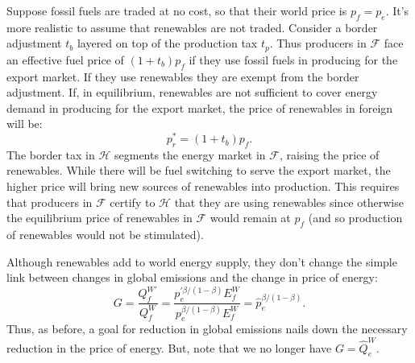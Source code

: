 \documentclass[notitlepage,12pt]{article}
\begin{document}
Suppose fossil fuels are traded at no cost, so that their world price is $%
p_{f}=p_{e}$. It's more realistic to assume that renewables are not traded.
Consider a border adjustment $t_{b}$ layered on top of the production tax $%
t_{p}$. Thus producers in $\mathcal{F}$ face an effective fuel price of $%
(1+t_{b})p_{f}$ if they use fossil fuels in producing for the export market.
If they use renewables they are exempt from the border adjustment. If, in
equilibrium, renewables are not sufficient to cover energy demand in
producing for the export market, the price of renewables in foreign will be:%
\begin{equation*}
p_{r}^{\ast }=(1+t_{b})p_{f}.
\end{equation*}%
The border tax in $\mathcal{H}$ segments the energy market in $\mathcal{F}$,
raising the price of renewables. While there will be fuel switching to serve
the export market, the higher price will bring new sources of renewables
into production. This requires that producers in $\mathcal{F}$ certify to $%
\mathcal{H}$ that they are using renewables since otherwise the equilibrium
price of renewables in $\mathcal{F}$ would remain at $p_{f}$ (and so
production of renewables would not be stimulated).

Although renewables add to world energy supply, they don't change the simple
link between changes in global emissions and the change in price of energy:%
\begin{equation*}
G=\frac{Q_{f}^{W\prime }}{Q_{f}^{W}}=\frac{p_{e}^{\prime \beta /(1-\beta
)}E_{f}^{W}}{p_{e}^{\beta /(1-\beta )}E_{f}^{W}}=\hat{p}_{e}^{\beta
/(1-\beta )}.
\end{equation*}%
Thus, as before, a goal for reduction in global emissions nails down the
necessary reduction in the price of energy. But, note that we no longer have 
$G=\hat{Q}_{e}^{W}$.
\end{document}
